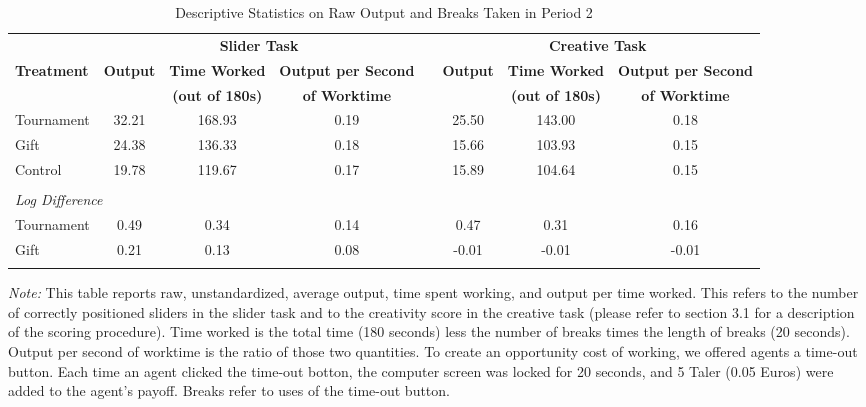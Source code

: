 \begin{landscape}
\begin{table}[h]%
\setlength\tabcolsep{2pt}
\caption{Descriptive Statistics on Raw Output and Breaks Taken in Period 2}
\label{tab:BreaksBreakdown}
\begin{center}%
{\small\renewcommand{\arraystretch}{1}%
\begin{tabular}{lccccccc}
\hline\hline\noalign{\smallskip}
& \multicolumn{3}{c}{\bf Slider Task} & & \multicolumn{3}{c}{\bf Creative Task} \\ \cline{2-4} \cline{6-8}
\bf Treatment & \bf Output & \bf Time Worked & \bf Output per Second && \bf Output & \bf Time Worked & \bf Output per Second \\
& & \bf (out of 180s) & \bf of Worktime & & & \bf (out of 180s) & \bf of Worktime \\
\hline
Tournament &    32.21 &   168.93 &     0.19&&    25.50&   143.00&     0.18 \\ 
Gift &    24.38 &   136.33 &     0.18&&    15.66&   103.93&     0.15 \\ 
Control &    19.78 &   119.67 &     0.17&&    15.89&   104.64&     0.15 \\ 
 \\
 \multicolumn{3}{l}{\textit{Log Difference}} \\
\hspace{10pt} Tournament &     0.49 &     0.34 &     0.14&&     0.47&     0.31&     0.16 \\ 
\hspace{10pt} Gift &     0.21 &     0.13 &     0.08&&    -0.01&    -0.01&    -0.01 \\ 
\hline\hline\noalign{\medskip}
\end{tabular}}
\begin{minipage}{1.2\textwidth}
\footnotesize {\it Note:} This table reports raw, unstandardized, average output, time spent working, and output per time worked. 
This refers to the number of correctly positioned sliders in the slider task and to the creativity score in the creative task (please refer to section 3.1 for a description of the scoring procedure). 
Time worked is the total time (180 seconds) less the number of breaks times the length of breaks (20 seconds). 
Output per second of worktime is the ratio of those two quantities. 
To create an opportunity cost of working, we offered agents a time-out button. Each time an agent clicked the time-out botton, the computer screen was locked for 20 seconds, and 5 Taler (0.05 Euros) were added to the agent's payoff. Breaks refer to uses of the time-out button. 

\end{minipage}
\end{center}
\end{table}
\end{landscape}
